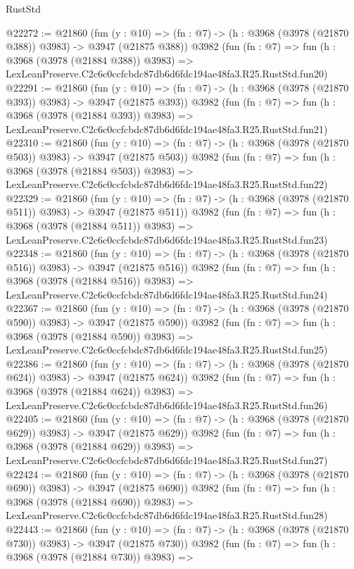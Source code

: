 \begin{lexlean}{RustStd}
\begin{coremodule}
@22272 := @21860
    (fun (y : @10) => (fn : @7) -> (h : @3968 (@3978 (@21870 @388)) @3983) -> @3947 (@21875 @388))
    @3982
    (fun (fn : @7) =>
    fun (h : @3968 (@3978 (@21884 @388)) @3983) =>
    LexLeanPreserve.C2c6c0ccfcbdc87db6d6fdc194ae48fa3.R25.RustStd.fun20)
@22291 := @21860
    (fun (y : @10) => (fn : @7) -> (h : @3968 (@3978 (@21870 @393)) @3983) -> @3947 (@21875 @393))
    @3982
    (fun (fn : @7) =>
    fun (h : @3968 (@3978 (@21884 @393)) @3983) =>
    LexLeanPreserve.C2c6c0ccfcbdc87db6d6fdc194ae48fa3.R25.RustStd.fun21)
@22310 := @21860
    (fun (y : @10) => (fn : @7) -> (h : @3968 (@3978 (@21870 @503)) @3983) -> @3947 (@21875 @503))
    @3982
    (fun (fn : @7) =>
    fun (h : @3968 (@3978 (@21884 @503)) @3983) =>
    LexLeanPreserve.C2c6c0ccfcbdc87db6d6fdc194ae48fa3.R25.RustStd.fun22)
@22329 := @21860
    (fun (y : @10) => (fn : @7) -> (h : @3968 (@3978 (@21870 @511)) @3983) -> @3947 (@21875 @511))
    @3982
    (fun (fn : @7) =>
    fun (h : @3968 (@3978 (@21884 @511)) @3983) =>
    LexLeanPreserve.C2c6c0ccfcbdc87db6d6fdc194ae48fa3.R25.RustStd.fun23)
@22348 := @21860
    (fun (y : @10) => (fn : @7) -> (h : @3968 (@3978 (@21870 @516)) @3983) -> @3947 (@21875 @516))
    @3982
    (fun (fn : @7) =>
    fun (h : @3968 (@3978 (@21884 @516)) @3983) =>
    LexLeanPreserve.C2c6c0ccfcbdc87db6d6fdc194ae48fa3.R25.RustStd.fun24)
@22367 := @21860
    (fun (y : @10) => (fn : @7) -> (h : @3968 (@3978 (@21870 @590)) @3983) -> @3947 (@21875 @590))
    @3982
    (fun (fn : @7) =>
    fun (h : @3968 (@3978 (@21884 @590)) @3983) =>
    LexLeanPreserve.C2c6c0ccfcbdc87db6d6fdc194ae48fa3.R25.RustStd.fun25)
@22386 := @21860
    (fun (y : @10) => (fn : @7) -> (h : @3968 (@3978 (@21870 @624)) @3983) -> @3947 (@21875 @624))
    @3982
    (fun (fn : @7) =>
    fun (h : @3968 (@3978 (@21884 @624)) @3983) =>
    LexLeanPreserve.C2c6c0ccfcbdc87db6d6fdc194ae48fa3.R25.RustStd.fun26)
@22405 := @21860
    (fun (y : @10) => (fn : @7) -> (h : @3968 (@3978 (@21870 @629)) @3983) -> @3947 (@21875 @629))
    @3982
    (fun (fn : @7) =>
    fun (h : @3968 (@3978 (@21884 @629)) @3983) =>
    LexLeanPreserve.C2c6c0ccfcbdc87db6d6fdc194ae48fa3.R25.RustStd.fun27)
@22424 := @21860
    (fun (y : @10) => (fn : @7) -> (h : @3968 (@3978 (@21870 @690)) @3983) -> @3947 (@21875 @690))
    @3982
    (fun (fn : @7) =>
    fun (h : @3968 (@3978 (@21884 @690)) @3983) =>
    LexLeanPreserve.C2c6c0ccfcbdc87db6d6fdc194ae48fa3.R25.RustStd.fun28)
@22443 := @21860
    (fun (y : @10) => (fn : @7) -> (h : @3968 (@3978 (@21870 @730)) @3983) -> @3947 (@21875 @730))
    @3982
    (fun (fn : @7) =>
    fun (h : @3968 (@3978 (@21884 @730)) @3983) =>

\end{coremodule}
\end{lexlean}
